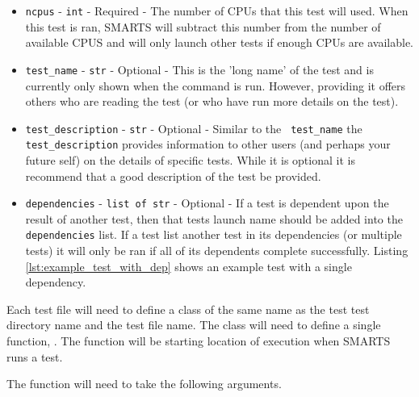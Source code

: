 \begin{itemize}
    \item {\tt ncpus} - {\tt int} - Required - The number of CPUs that this
    test will used. When this test is ran, SMARTS will subtract this number
    from the number of available CPUS and will only launch other tests if
    enough CPUs are available.
    \item {\tt test\_name} - {\tt str} - Optional - This is the 'long name' of
    the test and is currently only shown when the \listtest command is run.
    However, providing it offers others who are reading the test (or who have
    run \listtest more details on the test).
    \item {\tt test\_description} - {\tt str} - Optional - Similar to the {\tt
    test\_name} the {\tt test\_description} provides information to other users
    (and perhaps your future self) on the details of specific tests. While it
    is optional it is recommend that a good description of the test be
    provided.
    \item {\tt dependencies} - {\tt list of str} - Optional - If a test is
    dependent upon the result of another test, then that tests launch name
    should be added into the {\tt dependencies} list. If a test list another
    test in its dependencies (or multiple tests) it will only be ran if all of
    its dependents complete successfully. Listing
    \ref{lst:example_test_with_dep} shows an example test with a single
    dependency.
\end{itemize}

Each test file will need to define a class of the same name as the test
test directory name and the test file name. The class will need to define a
single function, \run. The \run function will be starting location of
execution when SMARTS runs a test.

The \run function will need to take the following arguments.

